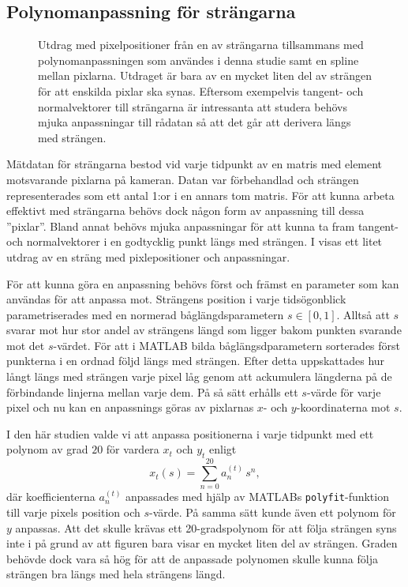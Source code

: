 \subsection{Polynomanpassning för strängarna} \label{sec:polynomanpassning}

\begin{figure}\centering

\caption{
Utdrag med pixelpositioner från en av strängarna tillsammans med polynomanpassningen som användes i denna studie samt en spline mellan pixlarna. Utdraget är bara av en mycket liten del av strängen för att enskilda pixlar ska synas.
Eftersom exempelvis tangent- och normalvektorer till strängarna är intressanta att studera behövs mjuka anpassningar till rådatan så att det går att derivera längs med strängen. 
}
\label{fig:strang_anpassning}
\end{figure}

Mätdatan för strängarna bestod vid varje tidpunkt av en matris med element motsvarande pixlarna på kameran. Datan var förbehandlad och strängen representerades som ett antal 1:or i en annars tom matris. 
För att kunna arbeta effektivt med strängarna behövs dock någon form av anpassning till dessa ''pixlar''. Bland annat behövs mjuka anpassningar för att kunna ta fram tangent- och normalvektorer i en godtycklig punkt längs med strängen. I  visas ett litet utdrag av en sträng med pixlepositioner och anpassningar. 

För att kunna göra en anpassning behövs först och främst en parameter som kan användas för att anpassa mot. 
Strängens position i varje tidsögonblick parametriserades med en normerad båglängdsparametern $s\in[0,1]$. Alltså att $s$ svarar mot hur stor andel av strängens längd som ligger bakom punkten svarande mot det $s$-värdet. 
För att i MATLAB bilda båglängsdparametern sorterades först punkterna i en ordnad följd längs med strängen. Efter detta uppskattades hur långt längs med strängen varje pixel låg genom att ackumulera längderna på de förbindande linjerna mellan varje dem. På så sätt erhålls ett $s$-värde för varje pixel och nu kan en anpassnings göras av pixlarnas $x$- och $y$-koordinaterna mot $s$.

I den här studien valde vi att anpassa positionerna i varje tidpunkt med ett polynom av grad $20$ för vardera $x_t$ och $y_t$ enligt
\begin{equation}\label{eq:anpassning}
x_t(s) = \sum_{n=0}^{20} a_n^{(t)} \,s^n,
\end{equation}
där koefficienterna $a_n^{(t)}$ anpassades med hjälp av MATLABs \texttt{polyfit}-funktion till varje pixels position och $s$-värde. På samma sätt kunde även ett polynom för $y$ anpassas. Att det skulle krävas ett 20-gradspolynom för att följa strängen syns inte i  på grund av att figuren bara visar en mycket liten del av strängen. Graden behövde dock vara så hög för att de anpassade polynomen skulle kunna följa strängen bra längs med hela strängens längd. 

